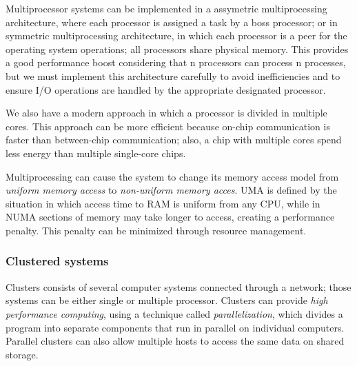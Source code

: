 \documentclass{article}
\begin{document}
Multiprocessor systems can be implemented in a assymetric multiprocessing architecture, where each processor is assigned a task by a boss processor; or in symmetric multiprocessing architecture, in which each processor is a peer for the operating system operations; all processors share physical memory. This provides a good performance boost considering that n processors can process n processes, but we must implement this architecture carefully to avoid inefficiencies and to ensure I/O operations are handled by the appropriate designated processor.

We also have a modern approach in which a processor is divided in multiple cores. This approach can be more efficient because on-chip communication is faster than between-chip communication; also, a chip with multiple cores spend less energy than multiple single-core chips.

Multiprocessing can cause the system to change its memory access model from \emph{uniform memory access} to \emph{non-uniform memory acces}. UMA is defined by the situation in which access time to RAM is uniform from any CPU, while in NUMA sections of memory may take longer to access, creating a performance penalty. This penalty can be minimized through resource management.

\subsubsection{Clustered systems}
Clusters consists of several computer systems connected through a network; those systems can be either single or multiple processor. Clusters can provide \emph{high performance computing}, using a technique called \emph{parallelization}, which divides a program into separate components that run in parallel on individual computers. Parallel clusters can also allow multiple hosts to access the same data on shared storage.
\end{document}
